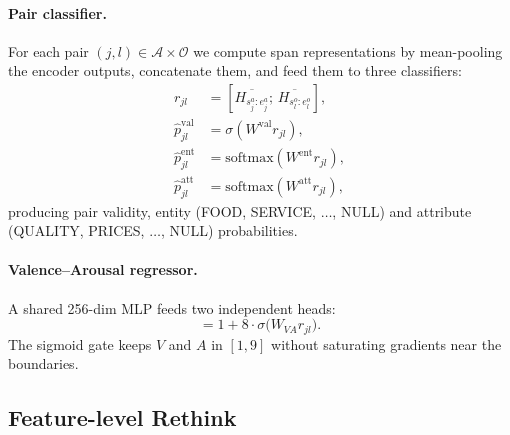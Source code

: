 \documentclass[runningheads]{llncs}
\begin{document}
\paragraph{Pair classifier.}
For each pair $(j,l) \in \mathcal{A}\times\mathcal{O}$ we compute span
representations by mean-pooling the encoder outputs, concatenate them,
and feed them to three classifiers:
\begin{align}
r_{jl} &= [\overline{H_{s^a_j:e^a_j}};\, \overline{H_{s^o_l:e^o_l}}],\\
\hat p^\text{val}_{jl} &= \sigma(W^\text{val} r_{jl}),\\
\hat p^\text{ent}_{jl} &= \mathrm{softmax}(W^\text{ent} r_{jl}),\\
\hat p^\text{att}_{jl} &= \mathrm{softmax}(W^\text{att} r_{jl}),
\end{align}
producing pair validity, entity (FOOD, SERVICE, $\dots$, NULL) and
attribute (QUALITY, PRICES, $\dots$, NULL) probabilities.

\paragraph{Valence--Arousal regressor.}
A shared 256-dim MLP feeds two independent heads:
\begin{equation}
[V_{jl}, A_{jl}] = 1 + 8\cdot\sigma\!\big(W_{VA} r_{jl}\big).
\label{eq:vahead}
\end{equation}
The sigmoid gate keeps $V$ and $A$ in $[1,9]$ without saturating
gradients near the boundaries.

\subsection{Feature-level Rethink}
\label{sec:method:rethink}
\end{document}
